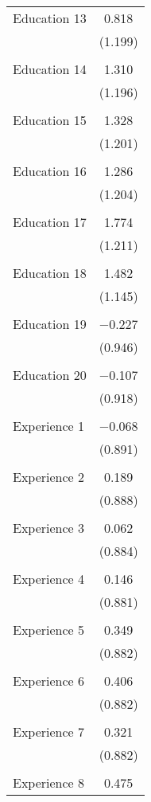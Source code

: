 \begin{table}[!htbp]
\begin{tabular}{@{\extracolsep{5pt}}lc}
 Education 13 & 0.818 \\ 
  & (1.199) \\ 
  & \\ 
 Education 14 & 1.310 \\ 
  & (1.196) \\ 
  & \\ 
 Education 15 & 1.328 \\ 
  & (1.201) \\ 
  & \\ 
 Education 16 & 1.286 \\ 
  & (1.204) \\ 
  & \\ 
 Education 17 & 1.774 \\ 
  & (1.211) \\ 
  & \\ 
 Education 18 & 1.482 \\ 
  & (1.145) \\ 
  & \\ 
 Education 19 & $-$0.227 \\ 
  & (0.946) \\ 
  & \\ 
 Education 20 & $-$0.107 \\ 
  & (0.918) \\ 
  & \\ 
 Experience 1 & $-$0.068 \\ 
  & (0.891) \\ 
  & \\ 
 Experience 2 & 0.189 \\ 
  & (0.888) \\ 
  & \\ 
 Experience 3 & 0.062 \\ 
  & (0.884) \\ 
  & \\ 
 Experience 4 & 0.146 \\ 
  & (0.881) \\ 
  & \\ 
 Experience 5 & 0.349 \\ 
  & (0.882) \\ 
  & \\ 
 Experience 6 & 0.406 \\ 
  & (0.882) \\ 
  & \\ 
 Experience 7 & 0.321 \\ 
  & (0.882) \\ 
  & \\ 
 Experience 8 & 0.475 \\ 

\end{tabular}
\end{table}
